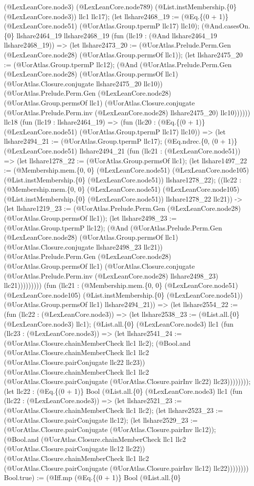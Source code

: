 \documentclass[11pt]{article}
\begin{document}
(@LexLeanCore.node3) (@LexLeanCore.node789) (@List.instMembership.\{0\} (@LexLeanCore.node3)) llc1 llc17); (let llshare2468\_19 := (@Eq.\{(0 + 1)\} (@LexLeanCore.node51) (@UorAtlas.Group.tpermP llc17) llc10); (@And.casesOn.\{0\} llshare2464\_19 llshare2468\_19 (fun (llc19 : (@And llshare2464\_19 llshare2468\_19)) => (let llshare2473\_20 := (@UorAtlas.Prelude.Perm.Gen (@LexLeanCore.node28) (@UorAtlas.Group.permsOf llc1)); (let llshare2475\_20 := (@UorAtlas.Group.tpermP llc12); (@And (@UorAtlas.Prelude.Perm.Gen (@LexLeanCore.node28) (@UorAtlas.Group.permsOf llc1) (@UorAtlas.Closure.conjugate llshare2475\_20 llc10)) (@UorAtlas.Prelude.Perm.Gen (@LexLeanCore.node28) (@UorAtlas.Group.permsOf llc1) (@UorAtlas.Closure.conjugate (@UorAtlas.Prelude.Perm.inv (@LexLeanCore.node28) llshare2475\_20) llc10)))))) llc18 (fun (llc19 : llshare2464\_19) => (fun (llc20 : (@Eq.\{(0 + 1)\} (@LexLeanCore.node51) (@UorAtlas.Group.tpermP llc17) llc10)) => (let llshare2494\_21 := (@UorAtlas.Group.tpermP llc17); (@Eq.ndrec.\{0, (0 + 1)\} (@LexLeanCore.node51) llshare2494\_21 (fun (llc21 : (@LexLeanCore.node51)) => (let llshare1278\_22 := (@UorAtlas.Group.permsOf llc1); (let llshare1497\_22 := (@Membership.mem.\{0, 0\} (@LexLeanCore.node51) (@LexLeanCore.node105) (@List.instMembership.\{0\} (@LexLeanCore.node51)) llshare1278\_22); ((llc22 : (@Membership.mem.\{0, 0\} (@LexLeanCore.node51) (@LexLeanCore.node105) (@List.instMembership.\{0\} (@LexLeanCore.node51)) llshare1278\_22 llc21)) -> (let llshare1219\_23 := (@UorAtlas.Prelude.Perm.Gen (@LexLeanCore.node28) (@UorAtlas.Group.permsOf llc1)); (let llshare2498\_23 := (@UorAtlas.Group.tpermP llc12); (@And (@UorAtlas.Prelude.Perm.Gen (@LexLeanCore.node28) (@UorAtlas.Group.permsOf llc1) (@UorAtlas.Closure.conjugate llshare2498\_23 llc21)) (@UorAtlas.Prelude.Perm.Gen (@LexLeanCore.node28) (@UorAtlas.Group.permsOf llc1) (@UorAtlas.Closure.conjugate (@UorAtlas.Prelude.Perm.inv (@LexLeanCore.node28) llshare2498\_23) llc21))))))))) (fun (llc21 : (@Membership.mem.\{0, 0\} (@LexLeanCore.node51) (@LexLeanCore.node105) (@List.instMembership.\{0\} (@LexLeanCore.node51)) (@UorAtlas.Group.permsOf llc1) llshare2494\_21)) => (let llshare2554\_22 := (fun (llc22 : (@LexLeanCore.node3)) => (let llshare2538\_23 := (@List.all.\{0\} (@LexLeanCore.node3) llc1); (@List.all.\{0\} (@LexLeanCore.node3) llc1 (fun (llc23 : (@LexLeanCore.node3)) => (let llshare2541\_24 := (@UorAtlas.Closure.chainMemberCheck llc1 llc2); (@Bool.and (@UorAtlas.Closure.chainMemberCheck llc1 llc2 (@UorAtlas.Closure.pairConjugate llc22 llc23)) (@UorAtlas.Closure.chainMemberCheck llc1 llc2 (@UorAtlas.Closure.pairConjugate (@UorAtlas.Closure.pairInv llc22) llc23)))))))); (let llc22 : (@Eq.\{(0 + 1)\} Bool (@List.all.\{0\} (@LexLeanCore.node3) llc1 (fun (llc22 : (@LexLeanCore.node3)) => (let llshare2521\_23 := (@UorAtlas.Closure.chainMemberCheck llc1 llc2); (let llshare2523\_23 := (@UorAtlas.Closure.pairConjugate llc12); (let llshare2529\_23 := (@UorAtlas.Closure.pairConjugate (@UorAtlas.Closure.pairInv llc12)); (@Bool.and (@UorAtlas.Closure.chainMemberCheck llc1 llc2 (@UorAtlas.Closure.pairConjugate llc12 llc22)) (@UorAtlas.Closure.chainMemberCheck llc1 llc2 (@UorAtlas.Closure.pairConjugate (@UorAtlas.Closure.pairInv llc12) llc22)))))))) Bool.true) := (@Iff.mp (@Eq.\{(0 + 1)\} Bool (@List.all.\{0\} 
\end{document}
